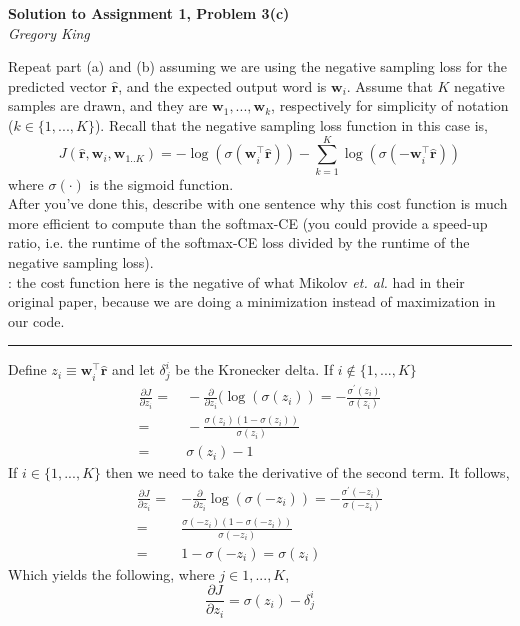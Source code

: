 \documentclass[letter,12pt]{article}
\newcommand{\myhwtitle}[3]
{\begin{center}
{\large {\bf Solution to Assignment {#1}, Problem {#2}}}\\
\medskip 
{\it {#3}} %
\end{center}}
\begin{document}
\myhwtitle{1}{3(c)}{Gregory King}
\bigskip
\noindent Repeat part (a) and (b) assuming we are using the negative sampling loss for the predicted vector $\hat{\boldsymbol r}$, and 
the expected output word is ${\boldsymbol w}_{i}$. Assume that $K$ negative samples are drawn, and they are ${\boldsymbol w}_{1},...,{\boldsymbol w}_{k}$, respectively for simplicity of notation ($k\in\{1,...,K\}$). Recall that the negative sampling loss function in this case is,
\begin{equation}
J(\hat{\boldsymbol r}, {\boldsymbol w}_{i}, {\boldsymbol w}_{1..K}) = -\log(\sigma( {\boldsymbol w}^{\top}_{i}\hat{\boldsymbol r})) - \sum^{K}_{k=1}\log(\sigma(- {\boldsymbol w}^{\top}_{i}\hat{\boldsymbol r}))
\end{equation}
where $\sigma(\cdot)$ is the sigmoid function.\\

\noindent After you've done this, describe with one sentence why this cost function is much more efficient to
compute than the softmax-CE (you could provide a speed-up ratio, i.e. the runtime of the softmax-CE loss divided by the
runtime of the negative sampling loss).\\

: the cost function here is the negative of what Mikolov \textit{et. al.} had in their original paper,
because we are doing a minimization instead of maximization in our code.\vspace{5mm}

\noindent\rule{\textwidth}{0.4pt}\vspace{5mm}
Define $z_{i} \equiv {\boldsymbol w}^{\top}_{i}\hat{\boldsymbol r}$ and let $\delta^{i}_{j}$ be the Kronecker delta. If $i \notin \{1,...,K\}$
\begin{align}
\frac{\partial J}{\partial{z_{i}}} =& ~-\frac{\partial}{\partial{z_{i}}}(\log(\sigma(z_{i})) = -\frac{\sigma^{\prime}(z_{i})}{\sigma(z_{i})} \\
                                               =& ~-\frac{\sigma(z_{i})(1 - \sigma(z_{i}))}{\sigma(z_{i})} \\
                                               =& ~\sigma(z_{i}) - 1
\end{align}
If $i \in \{1,...,K\}$ then we need to take the derivative of the second term. It follows,
\begin{align}
\frac{\partial J}{\partial{z_{i}}} =& -\frac{\partial}{\partial{z_{i}}}\log(\sigma(-z_{i})) = -\frac{\sigma^{\prime}(-z_{i})}{\sigma(-z_{i})}\\
                                              =&  \frac{\sigma(-z_{i})(1 - \sigma(-z_{i}))}{\sigma(-z_{i})} \\
                                              =& 1 - \sigma(-z_{i}) = \sigma(z_{i})
\end{align}
Which yields the following, where $j\in{1,...,K}$,
\begin{equation*}
\frac{\partial{J}}{\partial{z_{i}}} = \sigma(z_{i}) - \delta^{i}_{j}
\end{equation*}
\end{document}

